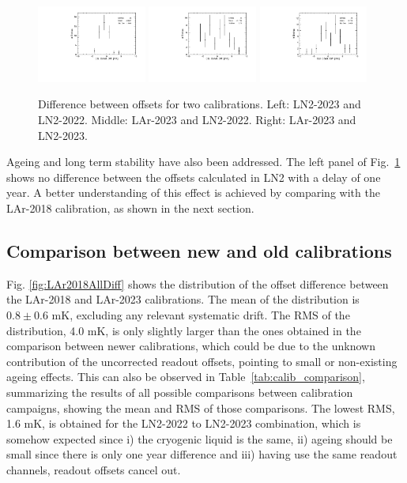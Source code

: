 \begin{figure}[htbp]
\centering
{\includegraphics[width=0.32\textwidth]{images/LN2023-LN2022.pdf}}
{\includegraphics[width=0.32\textwidth]{images/Lar2023-LN2022.pdf}}
{\includegraphics[width=0.32\textwidth]{images/Lar2023-LN2023.pdf}}
\caption{Difference between offsets for two calibrations. Left: LN2-2023 and LN2-2022. Middle: LAr-2023 and LN2-2022. Right:  LAr-2023 and LN2-2023.}
\label{fig:comp_newCalib}
\end{figure}

Ageing and long term stability have also been addressed. The left panel of Fig.~\ref{fig:comp_newCalib} shows no difference between the offsets calculated in LN2 with a delay of one year. A better understanding of this effect is achieved by comparing with the LAr-2018 calibration, as shown in the next section.

\subsection{Comparison between new and old calibrations}
\label{sec:compNewOld}

Fig. \ref{fig:LAr2018AllDiff} shows the distribution of the offset difference between the LAr-2018 and LAr-2023 calibrations. The mean of the distribution is $0.8\pm0.6$ mK, excluding any relevant systematic drift. The RMS of the distribution, 4.0 mK, is only slightly larger than the ones obtained in the comparison between newer calibrations, which could be due to the unknown contribution of the uncorrected readout offsets, pointing to small or non-existing ageing effects. This can also be observed in Table~\ref{tab:calib_comparison}, summarizing the results of all possible comparisons between calibration campaigns, showing the mean and RMS of those comparisons. The lowest RMS, 1.6 mK, is obtained for the LN2-2022 to LN2-2023 combination, which is somehow expected since i) the cryogenic liquid is the same, ii) ageing should be small since there is only one year difference and iii) having use the same readout channels, readout offsets cancel out.

